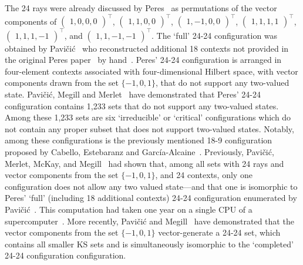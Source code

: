 \documentclass[
  twocolumn,
 showpacs,
 showkeys,
 preprintnumbers,
 amsmath,amssymb,
 aps,
 pra,
  longbibliography,
 floatfix,
 ]{revtex4-2}
\begin{document}
The 24 rays were already discussed by Peres~\cite{peres-91} as permutations of the vector components of
$\begin{pmatrix}
{1, 0, 0, 0}
\end{pmatrix}^\intercal $,
$\begin{pmatrix}
{1, 1, 0, 0}
\end{pmatrix}^\intercal $,
$\begin{pmatrix}
{1, -1, 0, 0}
\end{pmatrix}^\intercal $,
$\begin{pmatrix}
{1, 1, 1, 1}
\end{pmatrix}^\intercal $,
$\begin{pmatrix}
{1, 1, 1, -1}
\end{pmatrix}^\intercal $, and
$\begin{pmatrix}
{1, 1, -1, -1}
\end{pmatrix}^\intercal $.
The `full' 24-24 configuration was obtained by Pavi\v{c}i\'{c}~\cite{pavicic-2004ksafq} who
reconstructed additional 18 contexts not provided in the original Peres paper~\cite{peres-91} by hand~\cite{pavicic-private-commun-2024}.
Peres' 24-24 configuration is arranged in four-element contexts  associated with four-dimensional Hilbert space, with vector
components drawn from the set $\{-1,0,1\}$, that do not support any two-valued state.
Pavi\v{c}i\'{c}, Megill and Merlet~\cite[Table~1]{pavicic-2010nkss}
have demonstrated that Peres' 24-24 configuration contains 1,233 sets that do not support any two-valued states.
Among these 1,233 sets are six `irreducible' or `critical' configurations which do not contain any proper subset that does not support two-valued states.
Notably, among these configurations is the previously mentioned 18-9 configuration proposed by Cabello, Estebaranz and Garc{\'{i}}a-Alcaine~\cite{cabello-96}.
Previously, Pavi\v{c}i\'{c}, Merlet, McKay, and Megill~\cite[Section~5(viii)]{Pavicic-2005,pavicic-2005csvcorri} had shown that,
among all sets with 24 rays and vector components from the set $\{-1,0,1\}$, and
24 contexts, only one configuration does not
allow any two valued state---and that one is isomorphic to Peres' `full' (including 18 additional contexts)
24-24 configuration enumerated by Pavi\v{c}i\'{c}~\cite{pavicic-2004ksafq}.
This computation had taken one year on a single CPU of a supercomputer~\cite{pavicic-private-commun-2024}.
More recently, Pavi\v{c}i\'{c} and Megill~\cite[Table~1]{Pavii2018} have demonstrated that the vector components from the set $\{-1,0,1\}$
vector-generate a  24-24 set, which contains all smaller KS sets  and is simultaneously isomorphic to the `completed'  24-24 configuration configuration.
\end{document}
